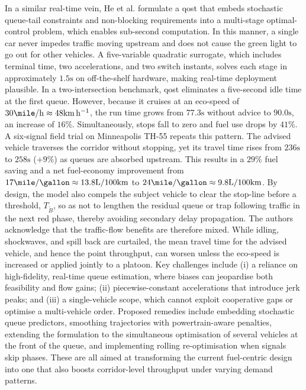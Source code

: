 In a similar real-time vein, He et al. \cite{He2015} formulate a \ac{qost} that embeds stochastic queue-tail constraints and non-blocking requirements into a multi-stage optimal-control problem, which enables sub-second computation. In this manner, a single car never impedes traffic moving upstream and does not cause the green light to go out for other vehicles. A five-variable quadratic surrogate, which includes terminal time, two accelerations, and two switch instants, solves each stage in approximately $1.5\unit{\second}$ on off-the-shelf hardware, making real-time deployment plausible. In a two-intersection benchmark, \ac{qost} eliminates a five-second idle time at the first queue. However, because it cruises at an eco-speed of $30\unit{\mile\per\hour} \approx 48\unit{\kilo\metre\per\hour}$, the run time grows from $77.3\unit{\second}$ without advice to $90.0\unit{\second}$, an increase of $16\%$. Simultaneously, stops fall to zero and fuel use drops by $41\%$. A six-signal field trial on Minneapolis TH-55 repeats this pattern. The advised vehicle traverses the corridor without stopping, yet its travel time rises from $236\unit{\second}$ to $258\unit{\second}$ ($+9\%$) as queues are absorbed upstream. This results in a $29\%$ fuel saving and a net fuel-economy improvement from $17\unit{\mile\per\gallon} \approx 13.8\unit{\liter\per100\kilo\metre}$ to $24\unit{\mile\per\gallon} \approx 9.8\unit{\liter\per100\kilo\metre}$.
By design, the model also compels the subject vehicle to clear the stop-line before a threshold, $T_{\tilde B}$, so as not to lengthen the residual queue or trap following traffic in the next red phase, thereby avoiding secondary delay propagation. The authors acknowledge that the traffic-flow benefits are therefore mixed. While idling, shockwaves, and spill back are curtailed, the mean travel time for the advised vehicle, and hence the point throughput, can worsen unless the eco-speed is increased or applied jointly to a platoon. Key challenges include (i) a reliance on high-fidelity, real-time queue estimation, where biases can jeopardise both feasibility and flow gains; (ii) piecewise-constant accelerations that introduce jerk peaks; and (iii) a single-vehicle scope, which cannot exploit cooperative gaps or optimise a multi-vehicle order. Proposed remedies include embedding stochastic queue predictors, smoothing trajectories with powertrain-aware penalties, extending the formulation to the simultaneous optimisation of several vehicles at the front of the queue, and implementing rolling re-optimisation when signals skip phases. These are all aimed at transforming the current fuel-centric design into one that also boosts corridor-level throughput under varying demand patterns.
